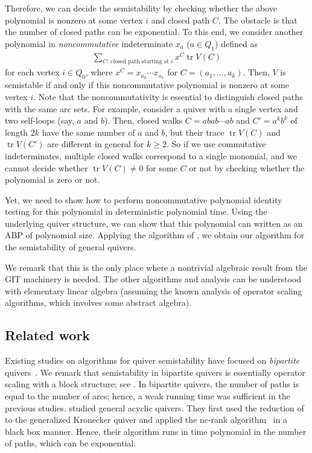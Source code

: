 \documentclass[a4paper,11pt]{article}
\numberwithin{equation}{section}
\DeclareMathOperator{\tr}{tr}
\begin{document}
Therefore, we can decide the semistability by checking whether the above polynomial is nonzero at some vertex $i$ and closed path $C$.
The obstacle is that the number of closed paths can be exponential.
To this end, we consider another polynomial in \emph{noncommutative} indeterminate $x_a$ ($a \in Q_1$) defined as
\begin{align}
    \sum_{\text{$C$: closed path starting at $i$}} x^C\tr V(C)
\end{align}
for each vertex $i \in Q_0$, where $x^C = x_{a_k} \cdots x_{a_1}$ for $C = (a_1, \dots, a_k)$.
Then, $V$ is semistable if and only if this noncommutative polynomial is nonzero at some vertex $i$.
Note that the noncommutativity is essential to distinguish closed paths with the same arc sets.
For example, consider a quiver with a single vertex and two self-loops (say, $a$ and $b$).
Then, closed walks $C = abab \cdots ab$ and $C' = a^k b^k$ of length $2k$ have the same number of $a$ and $b$, but their trace $\tr V(C)$ and $\tr V(C')$ are different in general for $k \geq 2$.
So if we use commutative indeterminates, multiple closed walks correspond to a single monomial, and we cannot decide whether $\tr V(C) \neq 0$ for some $C$ or not by checking whether the polynomial is zero or not.

Yet, we need to show how to perform noncommutative polynomial identity testing for this polynomial in deterministic polynomial time.
Using the underlying quiver structure, we can show that this polynomial can written as an ABP of polynomial size.
Applying the algorithm of \citet{Raz2005}, we obtain our algorithm for the semistability of general quivers. 

We remark that this is the only place where a nontrivial algebraic result from the GIT machinery is needed.
The other algorithms and analysis can be understood with elementary linear algebra (assuming the known analysis of operator scaling algorithms, which involves some abstract algebra).

\subsection{Related work}
Existing studies on algorithms for quiver semistability have focused on \emph{bipartite} quivers~\citep{Chindris2021,Chindris2022a,Chindris2022b,Franks2023b}.
We remark that semistability in bipartite quivers is essentially operator scaling with a block structure; see .
In bipartite quivers, the number of paths is equal to the number of arcs; hence, a weak running time was sufficient in the previous studies.
\cite{Huszar2021,Cheng2024} studied general acyclic quivers.
They first used the reduction of \citep{Derksen2017} to the generalized Kronecker quiver and applied the nc-rank algorithm~\cite{Ivanyos2018} in a black box manner.
Hence, their algorithm runs in time polynomial in the number of paths, which can be exponential.
\end{document}
